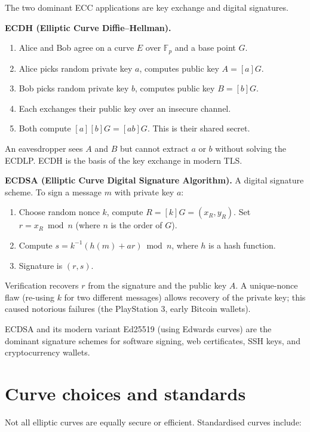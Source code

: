 The two dominant ECC applications are key exchange and digital signatures.

\textbf{ECDH (Elliptic Curve Diffie--Hellman).}
\begin{enumerate}
  \item Alice and Bob agree on a curve $E$ over $\mathbb{F}_p$ and a base point $G$.
  \item Alice picks random private key $a$, computes public key $A = [a]G$.
  \item Bob picks random private key $b$, computes public key $B = [b]G$.
  \item Each exchanges their public key over an insecure channel.
  \item Both compute $[a][b]G = [ab]G$. This is their shared secret.
\end{enumerate}

An eavesdropper sees $A$ and $B$ but cannot extract $a$ or $b$ without solving the ECDLP. ECDH is the basis of the key exchange in modern TLS.

\textbf{ECDSA (Elliptic Curve Digital Signature Algorithm).} A digital signature scheme. To sign a message $m$ with private key $a$:
\begin{enumerate}
  \item Choose random nonce $k$, compute $R = [k]G = (x_R, y_R)$. Set $r = x_R \bmod n$ (where $n$ is the order of $G$).
  \item Compute $s = k^{-1}(h(m) + a r) \bmod n$, where $h$ is a hash function.
  \item Signature is $(r, s)$.
\end{enumerate}
Verification recovers $r$ from the signature and the public key $A$. A unique-nonce flaw (re-using $k$ for two different messages) allows recovery of the private key; this caused notorious failures (the PlayStation 3, early Bitcoin wallets).

ECDSA and its modern variant Ed25519 (using Edwards curves) are the dominant signature schemes for software signing, web certificates, SSH keys, and cryptocurrency wallets.

\section{Curve choices and standards}

Not all elliptic curves are equally secure or efficient. Standardised curves include:

